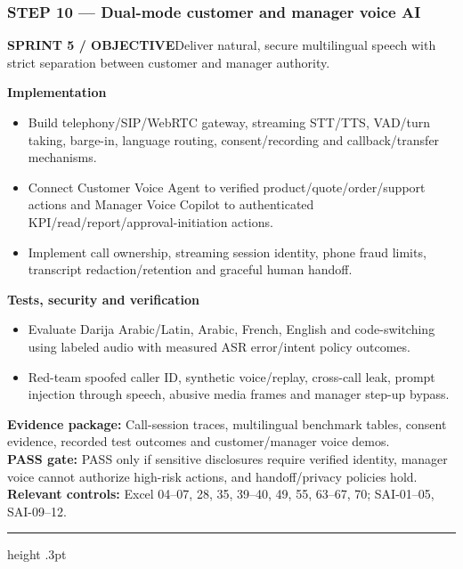 \documentclass[10.5pt,a4paper,oneside]{article}
\newcommand{\eyebrow}[1]{{\sffamily\footnotesize\bfseries\color{gold}\MakeUppercase{#1}}}
\begin{document}
\subsubsection*{STEP 10 --- Dual-mode customer and manager voice AI}
\eyebrow{Sprint 5 / objective}\quad Deliver natural, secure multilingual speech with strict separation between customer and manager authority.
\begin{tcolorbox}[colback=warm,colframe=line,boxrule=.45pt,arc=2pt,left=8pt,right=8pt,top=6pt,bottom=6pt]\textbf{Implementation}
\begin{itemize}
\item Build telephony/SIP/WebRTC gateway, streaming STT/TTS, VAD/turn taking, barge-in, language routing, consent/recording and callback/transfer mechanisms.
\item Connect Customer Voice Agent to verified product/quote/order/support actions and Manager Voice Copilot to authenticated KPI/read/report/approval-initiation actions.
\item Implement call ownership, streaming session identity, phone fraud limits, transcript redaction/retention and graceful human handoff.
\end{itemize}
\textbf{Tests, security and verification}
\begin{itemize}
\item Evaluate Darija Arabic/Latin, Arabic, French, English and code-switching using labeled audio with measured ASR error/intent policy outcomes.
\item Red-team spoofed caller ID, synthetic voice/replay, cross-call leak, prompt injection through speech, abusive media frames and manager step-up bypass.
\end{itemize}
\textbf{Evidence package:} Call-session traces, multilingual benchmark tables, consent evidence, recorded test outcomes and customer/manager voice demos.\\
\textbf{PASS gate:} PASS only if sensitive disclosures require verified identity, manager voice cannot authorize high-risk actions, and handoff/privacy policies hold.\\
\textbf{Relevant controls:} Excel 04--07, 28, 35, 39--40, 49, 55, 63--67, 70; SAI-01--05, SAI-09--12.
\end{tcolorbox}
\medskip\hrule height .3pt\medskip\Needspace{100mm}
\end{document}
